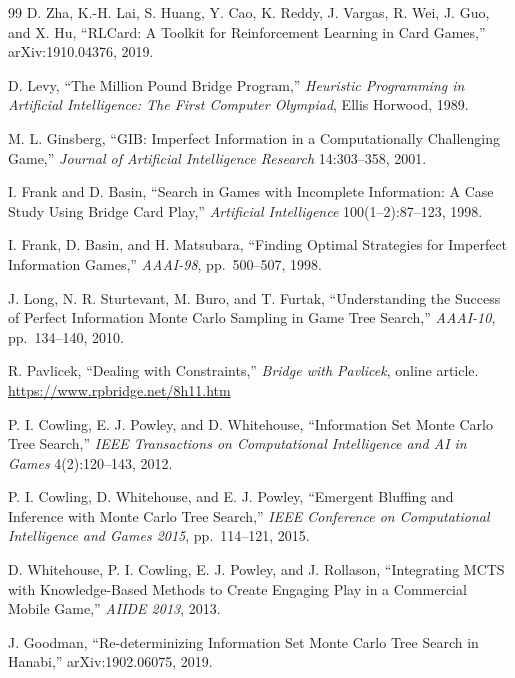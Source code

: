 \begin{thebibliography}{99}
D. Zha, K.-H. Lai, S. Huang, Y. Cao, K. Reddy, J. Vargas, R. Wei, J. Guo, and
X. Hu, ``RLCard: A Toolkit for Reinforcement Learning in Card Games,''
arXiv:1910.04376, 2019.


D. Levy, ``The Million Pound Bridge Program,'' \emph{Heuristic Programming in
Artificial Intelligence: The First Computer Olympiad}, Ellis Horwood, 1989.

M. L. Ginsberg, ``GIB: Imperfect Information in a Computationally Challenging
Game,'' \emph{Journal of Artificial Intelligence Research} 14:303--358, 2001.

I. Frank and D. Basin, ``Search in Games with Incomplete Information: A Case
Study Using Bridge Card Play,'' \emph{Artificial Intelligence}
100(1--2):87--123, 1998.

I. Frank, D. Basin, and H. Matsubara, ``Finding Optimal Strategies for Imperfect
Information Games,'' \emph{AAAI-98}, pp.~500--507, 1998.

J. Long, N. R. Sturtevant, M. Buro, and T. Furtak, ``Understanding the Success
of Perfect Information Monte Carlo Sampling in Game Tree Search,''
\emph{AAAI-10}, pp.~134--140, 2010.

R. Pavlicek, ``Dealing with Constraints,'' \emph{Bridge with Pavlicek}, online
article.\\
\url{https://www.rpbridge.net/8h11.htm}

P. I. Cowling, E. J. Powley, and D. Whitehouse, ``Information Set Monte Carlo
Tree Search,'' \emph{IEEE Transactions on Computational Intelligence and AI in
Games} 4(2):120--143, 2012.

P. I. Cowling, D. Whitehouse, and E. J. Powley, ``Emergent Bluffing and
Inference with Monte Carlo Tree Search,'' \emph{IEEE Conference on Computational
Intelligence and Games 2015}, pp.~114--121, 2015.

D. Whitehouse, P. I. Cowling, E. J. Powley, and J. Rollason, ``Integrating MCTS
with Knowledge-Based Methods to Create Engaging Play in a Commercial Mobile
Game,'' \emph{AIIDE 2013}, 2013.

J. Goodman, ``Re-determinizing Information Set Monte Carlo Tree Search in
Hanabi,'' arXiv:1902.06075, 2019.


\end{thebibliography}
